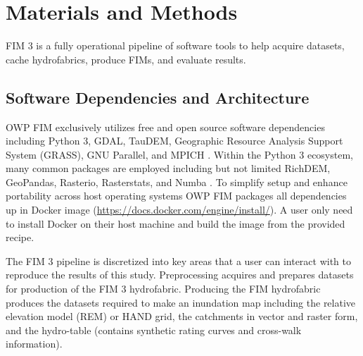 \section{Materials and Methods}
%
FIM 3 is a fully operational pipeline of software tools to help acquire datasets, cache hydrofabrics, produce FIMs, and evaluate results.
%
\subsection{Software Dependencies and Architecture}
%
OWP FIM exclusively utilizes free and open source software dependencies including Python 3, GDAL, TauDEM, Geographic Resource Analysis Support System (GRASS), GNU Parallel, and MPICH \cite{python382,gdal2020,tarboton2005terrain,grass2020,tange2015gnu,amer2021mpich}.
Within the Python 3 ecosystem, many common packages are employed including but not limited RichDEM, GeoPandas, Rasterio, Rasterstats, and Numba \cite{barnes2018richdem,jordahl2014geopandas,lam2015numba}. 
To simplify setup and enhance portability across host operating systems OWP FIM packages all dependencies up in Docker image (\url{https://docs.docker.com/engine/install/}). 
A user only need to install Docker on their host machine and build the image from the provided recipe. 

The FIM 3 pipeline is discretized into key areas that a user can interact with to reproduce the results of this study. Preprocessing acquires and prepares datasets for production of the FIM 3 hydrofabric. 
Producing the FIM hydrofabric produces the datasets required to make an inundation map including the relative elevation model (REM) or HAND grid, the catchments in vector and raster form, and the hydro-table (contains synthetic rating curves and cross-walk information).
%

